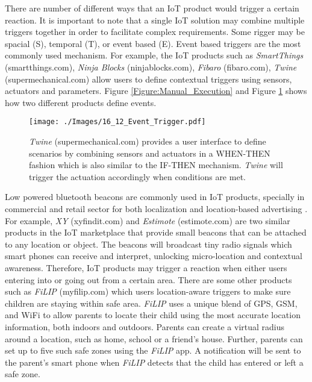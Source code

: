 \documentclass[journal]{IEEEtran}
\begin{document}
   
There are number of different ways that an IoT product would trigger a certain reaction. It is important to note that a single IoT solution may combine multiple triggers together in order to facilitate complex requirements. Some rigger may be spacial (S), temporal (T),  or event based (E). Event based triggers are the most commonly used mechanism. For example, the IoT products such as \textit{SmartThings} (smartthings.com), \textit{Ninja Blocks} (ninjablocks.com), \textit{Fibaro} (fibaro.com), \textit{Twine} (supermechanical.com) allow users to define contextual triggers using sensors, actuators and parameters. Figure \ref{Figure:Manual_Execution} and Figure \ref{Figure:Event_Trigger} shows how two different products define events.

 
       \begin{figure}[!b]
        \centering
\texttt{[image: ./Images/16\_12\_Event\_Trigger.pdf]}
\caption{\textit{Twine} (supermechanical.com) provides a user interface to define scenarios  by combining sensors and actuators in a WHEN-THEN fashion which is also similar to the IF-THEN mechanism. \textit{Twine}  will trigger the actuation accordingly when conditions are met.}
        \label{Figure:Event_Trigger}	
\end{figure}


Low powered bluetooth beacons are commonly used in IoT products, specially in commercial and retail sector for both localization and location-based advertising \cite{IA002}.   For example, \textit{XY} (xyfindit.com) and \textit{Estimote} (estimote.com) are two similar products in the IoT marketplace that provide small beacons that  can be attached to any location or object. The beacons will broadcast tiny radio signals which  smart phones can receive and interpret, unlocking micro-location and contextual awareness. Therefore, IoT products may trigger a reaction when either users entering into or going out from a certain area. There are some other products such as \textit{FiLIP}  (myfilip.com) which users location-aware triggers to make sure children are staying within safe area. \textit{FiLIP}  uses a unique blend of GPS, GSM, and WiFi to allow parents to locate their child using the most accurate location information, both indoors and outdoors. Parents can create a virtual radius around a location, such as home, school or a friend's house. Further, parents can set up to five such safe zones using the \textit{FiLIP} app. A notification will be sent to the parent's smart phone when \textit{FiLIP}  detects that the child has entered or left a safe zone. 
\end{document}
